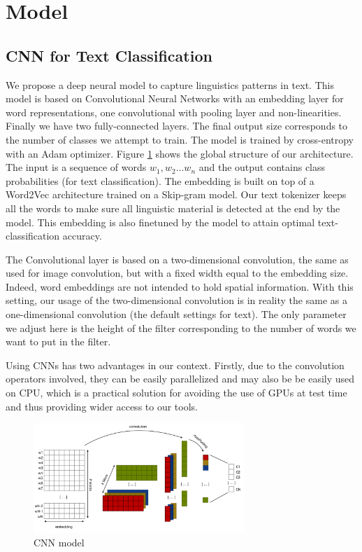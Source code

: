 \section{Model}
\label{sec:model}

\subsection{CNN for Text Classification}

We propose a deep neural model to capture linguistics patterns in text. This model is based on Convolutional Neural Networks with an embedding layer for word representations, one convolutional with pooling layer and non-linearities. Finally we have two fully-connected layers. The final output size corresponds to the number of classes we attempt to train. The model is trained by cross-entropy with an Adam optimizer. Figure \ref{cnn} shows the global structure of our architecture. The input is a sequence of words $ w_{1}, w_{2} ... w_{n} $ and the output contains class probabilities (for text classification). The embedding is built on top of a Word2Vec architecture trained on a Skip-gram model. Our text tokenizer keeps all the words to make sure all linguistic material is detected at the end by the model. This embedding is also finetuned by the model to attain optimal text-classification accuracy. 

The Convolutional layer is based on a two-dimensional convolution, the same as used for image convolution, but with a fixed width equal to the embedding size. Indeed, word embeddings are not intended to hold spatial information. With this setting, our usage of the two-dimensional convolution is in reality the same as a one-dimensional convolution (the default settings for text). The only parameter we adjust here is the height of the filter corresponding to the number of words we want to put in the filter. 

Using CNNs has two advantages in our context. Firstly, due to the convolution operators involved, they can be easily parallelized and may also be be easily used on CPU, which is a practical solution for avoiding the use of GPUs at test time and thus providing wider access to our tools.


\begin{figure}[h]
\begin{center}
\includegraphics[width=8cm]{img/model_classif2.png}
\caption{CNN model}
\label{cnn}
\end{center}
\end{figure}

